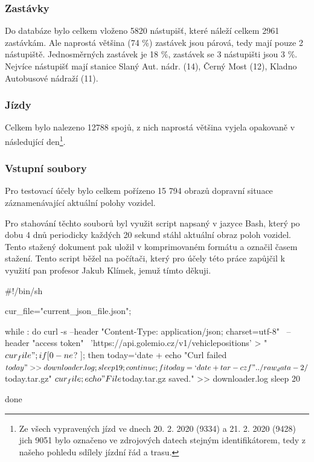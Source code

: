 \subsubsection{Zastávky} \label{subsubsection:zastavky}

Do databáze bylo celkem vloženo 5820 nástupišť, které náleží celkem 2961 zastávkám. Ale naprostá většina (74 \%) zastávek jsou párová, tedy mají pouze 2 nástupiště. Jednosměrných zastávek je 18 \%, zastávek se 3 nástupišti jsou 3 \%. Nejvíce nástupišť mají stanice Slaný Aut. nádr. (14), Černý Most (12), Kladno Autobusové nádraží (11).

\subsubsection{Jízdy}

Celkem bylo nalezeno 12788 spojů, z nich naprostá většina vyjela opakovaně v následující den\footnote{Ze všech vypravených jízd ve dnech 20. 2. 2020 (9334) a 21. 2. 2020 (9428) jich 9051 bylo označeno ve zdrojových datech stejným identifikátorem, tedy z našeho pohledu sdílely jízdní řád a trasu.}.

\subsubsection{Vstupní soubory} \label{subsubsection:vstupni_soubory}

Pro testovací účely bylo celkem pořízeno 15 794 obrazů dopravní situace záznamenávající aktuální polohy vozidel.

\bigbreak

Pro stahování těchto souborů byl využit script napsaný v jazyce Bash, který po dobu 4 dnů periodicky každých 20 sekund stáhl aktuální obraz poloh vozidel. Tento stažený dokument pak uložil v komprimovaném formátu a označil časem stažení. Tento script běžel na počítači, který pro účely této práce zapůjčil k využití pan profesor Jakub Klímek, jemuž tímto děkuji.

\begin{code}[frame=none]
#!/bin/sh

cur_file="current_json_file.json";

while :
do
  curl -s --header "Content-Type: application/json; charset=utf-8" \
  --header "access token" \
  'https://api.golemio.cz/v1/vehiclepositions' > "$cur_file";

  if [ 0 -ne $? ];
  then
    today=`date +%
    echo "Curl failed $today" >> downloader.log;
    sleep 19;
    continue;
  fi

  today=`date +%
  tar -czf "../raw_data-2/${today}.tar.gz" $cur_file;
  echo "File ${today}.tar.gz saved." >> downloader.log
  sleep 20

done

\end{code}

